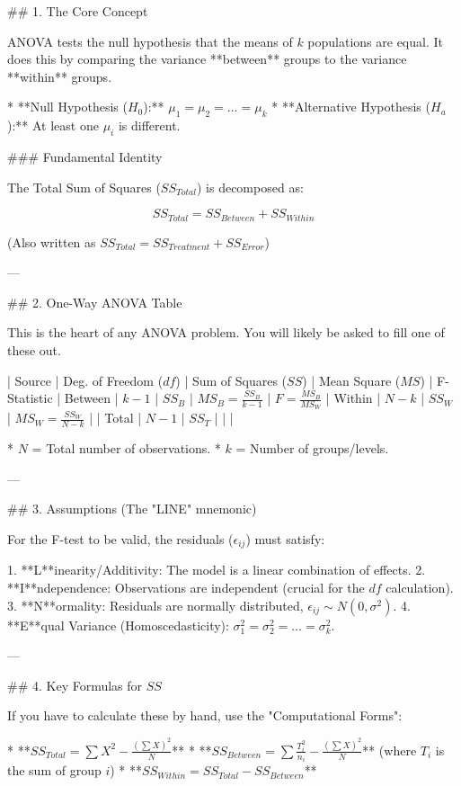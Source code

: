 ## 1. The Core Concept

ANOVA tests the null hypothesis that the means of \( k \) populations are equal. It does this by comparing the variance **between** groups to the variance **within** groups.

* **Null Hypothesis (\( H_0 \)):** \( \mu_1 = \mu_2 = \dots = \mu_k \)
* **Alternative Hypothesis (\( H_a \)):** At least one \( \mu_i \) is different.

### Fundamental Identity

The Total Sum of Squares (\( SS_{Total} \)) is decomposed as:


\[ SS_{Total} = SS_{Between} + SS_{Within} \]


(Also written as \( SS_{Total} = SS_{Treatment} + SS_{Error} \))

---

## 2. One-Way ANOVA Table

This is the heart of any ANOVA problem. You will likely be asked to fill one of these out.

| Source | Deg. of Freedom (\( df \)) | Sum of Squares (\( SS \)) | Mean Square (\( MS \)) | F-Statistic |
Between | \( k - 1 \) | \( SS_B \) | \( MS_B = \frac{SS_B}{k-1} \) | \( F = \frac{MS_B}{MS_W} \) |
Within | \( N - k \) | \( SS_W \) | \( MS_W = \frac{SS_W}{N-k} \) |  |
Total | \( N - 1 \) | \( SS_T \) |  |  |

* \( N \) = Total number of observations.
* \( k \) = Number of groups/levels.

---

## 3. Assumptions (The "LINE" mnemonic)

For the F-test to be valid, the residuals (\( \epsilon_{ij} \)) must satisfy:

1. **L**inearity/Additivity: The model is a linear combination of effects.
2. **I**ndependence: Observations are independent (crucial for the \( df \) calculation).
3. **N**ormality: Residuals are normally distributed, \( \epsilon_{ij} \sim N(0, \sigma^2) \).
4. **E**qual Variance (Homoscedasticity): \( \sigma_1^2 = \sigma_2^2 = \dots = \sigma_k^2 \).

---

## 4. Key Formulas for \( SS \)

If you have to calculate these by hand, use the "Computational Forms":

* **\( SS_{Total} = \sum X^2 - \frac{(\sum X)^2}{N} \)**
* **\( SS_{Between} = \sum \frac{T_i^2}{n_i} - \frac{(\sum X)^2}{N} \)** (where \( T_i \) is the sum of group \( i \))
* **\( SS_{Within} = SS_{Total} - SS_{Between} \)**

